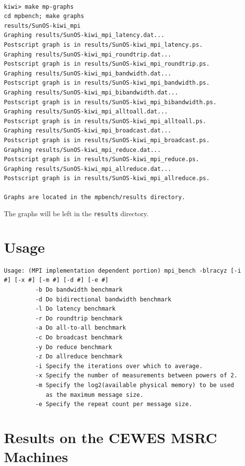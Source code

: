 \documentclass [12pt]{article}
\begin{document}
\begin{verbatim}

kiwi> make mp-graphs
cd mpbench; make graphs
results/SunOS-kiwi_mpi
Graphing results/SunOS-kiwi_mpi_latency.dat...
Postscript graph is in results/SunOS-kiwi_mpi_latency.ps.
Graphing results/SunOS-kiwi_mpi_roundtrip.dat...
Postscript graph is in results/SunOS-kiwi_mpi_roundtrip.ps.
Graphing results/SunOS-kiwi_mpi_bandwidth.dat...
Postscript graph is in results/SunOS-kiwi_mpi_bandwidth.ps.
Graphing results/SunOS-kiwi_mpi_bibandwidth.dat...
Postscript graph is in results/SunOS-kiwi_mpi_bibandwidth.ps.
Graphing results/SunOS-kiwi_mpi_alltoall.dat...
Postscript graph is in results/SunOS-kiwi_mpi_alltoall.ps.
Graphing results/SunOS-kiwi_mpi_broadcast.dat...
Postscript graph is in results/SunOS-kiwi_mpi_broadcast.ps.
Graphing results/SunOS-kiwi_mpi_reduce.dat...
Postscript graph is in results/SunOS-kiwi_mpi_reduce.ps.
Graphing results/SunOS-kiwi_mpi_allreduce.dat...
Postscript graph is in results/SunOS-kiwi_mpi_allreduce.ps.

Graphs are located in the mpbench/results directory.

\end{verbatim}

The graphs will be left in the {\tt results} directory.

\section {Usage}

\begin{verbatim}
Usage: (MPI implementation dependent portion) mpi_bench -blracyz [-i #] [-x #] [-m #] [-d #] [-e #]
         -b Do bandwidth benchmark
         -d Do bidirectional bandwidth benchmark
         -l Do latency benchmark
         -r Do roundtrip benchmark
         -a Do all-to-all benchmark
         -c Do broadcast benchmark
         -y Do reduce benchmark
         -z Do allreduce benchmark
         -i Specify the iterations over which to average. 
         -x Specify the number of measurements between powers of 2.  
         -m Specify the log2(available physical memory) to be used 
            as the maximum message size.
         -e Specify the repeat count per message size. 
\end{verbatim}

\newpage
\section{Results on the CEWES MSRC Machines}
\end{document}
